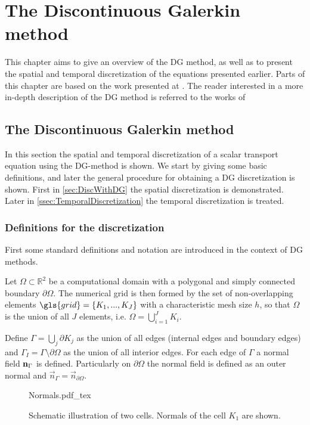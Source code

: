 \chapter{The Discontinuous Galerkin method}	\label{ch:NumericalMethods}
This chapter aims to give an overview of the DG method, as well as to present the spatial and temporal discretization of the equations presented earlier. Parts of this chapter are based on the work presented at \parencite{kummerExtendedDiscontinuousGalerkin2017,kikkerFullyCoupledHighorder, smudamartinDirectNumericalSimulation2021}. The reader interested in a more in-depth description of the DG method is referred to the works of  \textcite{cockburnDevelopmentDiscontinuousGalerkin2000,hesthavenNodalDiscontinuousGalerkin2008,dipietroMathematicalAspectsDiscontinuous2012}


\section{The Discontinuous Galerkin method}
In this section the spatial and temporal discretization of a scalar transport equation using the DG-method is shown. We start by giving some basic definitions, and later the general procedure for obtaining a DG discretization is shown. First in \cref{sec:DiscWithDG} the spatial discretization is demonstrated. Later in \cref{ssec:TemporalDiscretization} the temporal discretization is treated.
\subsection{Definitions for the discretization} \label{ssec:SpatDiscretization}
First some standard definitions and notation are introduced in the context of DG methods. 

Let $\Omega \subset \mathbb{R}^2$ be a computational domain with a polygonal and simply connected boundary $\partial \Omega$. The numerical grid is then formed by the set of non-overlapping elements $\gls{grid} = \{K_1, ..., K_J\}$ with a characteristic mesh size $h$, so that $\Omega$ is the union of all $J$ elements, i.e. $\Omega = \bigcup_{i=1}^J K_i$. 

Define $\Gamma = \bigcup_j \partial K_j$ as the union of all edges (internal edges and boundary edges) and $\Gamma_I = \Gamma \setminus \partial \Omega$ as the union of all interior edges.
For each edge of $\Gamma$ a normal field $\textbf{n}_{\Gamma}$ is defined. Particularly on $\partial \Omega$ the normal field is defined as an outer normal and $\vec{n}_\Gamma = \vec{n}_{\partial\Omega}$.
\begin{figure}[h]
	\begin{center}
		\def\svgwidth{0.5\textwidth}
		{Normals.pdf_tex}
		\caption{Schematic illustration of two cells. Normals of the cell $K_1$ are shown. }
		\label{fig:TwoCells}
	\end{center}
\end{figure}

